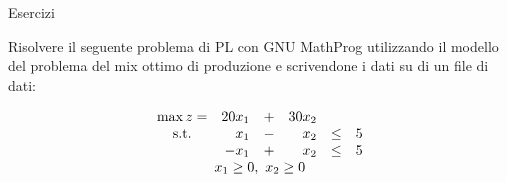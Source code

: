 \documentclass{beamer}
\begin{document}
\generatitolo


\begin{frame}%
{Esercizi}

Risolvere il seguente problema di PL con GNU MathProg
utilizzando il modello del problema del mix ottimo
di produzione e scrivendone i dati su di un file
di dati:

\begin{enumerate}
{\footnotesize \item
$$\begin{array}{crrrcr}
\max z=& 20 x_1 &+& 30 x_2\\
{\rm s.t.} &  x_1 &-&  x_2 & \leq & 5 \\
           &- x_1 &+&  x_2 & \leq & 5  \\
           \multicolumn{6}{c}{x_1 \geq 0,\ x_2 \geq 0}
\end{array}%
$$%
}
\end{enumerate}


\end{frame}
\end{document}
